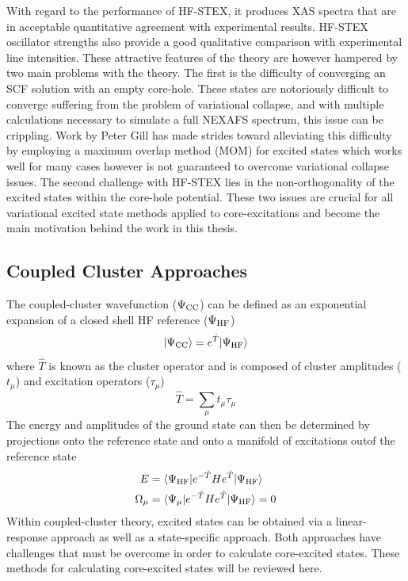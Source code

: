 \documentclass[final]{emory}
\begin{document}
With regard to the performance of HF-STEX, it produces XAS spectra that are in acceptable quantitative agreement with experimental results. HF-STEX oscillator strengths also provide a good qualitative comparison with experimental line intensities. These attractive features of the theory are however hampered by two main problems with the theory.  The first is the difficulty of converging an SCF solution with an empty core-hole. These states are notoriously difficult to converge suffering from the problem of variational collapse, and with multiple calculations necessary to simulate a full NEXAFS spectrum, this issue can be crippling. Work by Peter Gill has made strides toward alleviating this difficulty by employing a maximum overlap method (MOM) for excited states which works well for many cases however is not guaranteed to overcome variational collapse issues. The second challenge with HF-STEX lies in the non-orthogonality of the excited states within the core-hole potential. These two issues are crucial for all variational excited state methods applied to core-excitations and become the main motivation behind the work in this thesis. 

\subsection{Coupled Cluster Approaches}
The coupled-cluster wavefunction ($\Psi_{\rm CC}$) can be defined as an exponential expansion of a closed 
shell HF reference ($\Psi_{\rm HF}$)
\begin{equation}
|\Psi_{\rm CC}\rangle = e^{\hat{T}}|\Psi_{\rm HF} \rangle
\end{equation}
where $\hat{T}$ is known as the cluster operator and is composed of cluster amplitudes ($t_{\mu}$) and excitation operators ($\tau_{\mu}$)
\begin{equation}
\hat{T} = \sum_{\mu} t_{\mu} \tau_{\mu}
\end{equation}
The energy and amplitudes of the ground state can then be determined by projections onto the reference state and onto a manifold of excitations outof the reference state
\begin{align}
E &= \langle \Psi_{\rm HF} | e^{- \hat{T}}H e^{\hat{T}} |  \Psi_{\rm HF} \rangle \\
\Omega_{\mu} &= \langle \Psi_{\mu} | e^{- \hat{T}}H e^{\hat{T}} |  \Psi_{\rm HF} \rangle = 0
\end{align}
Within coupled-cluster theory, excited states can be obtained via a linear-response approach as well as a state-specific approach. Both approaches have challenges that must be overcome in order to calculate core-excited states. These methods for calculating core-excited states will be reviewed here.
\end{document}
